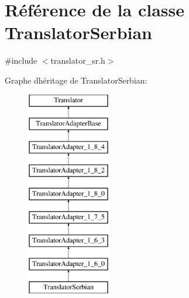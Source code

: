 \hypertarget{class_translator_serbian}{}\section{Référence de la classe Translator\+Serbian}
\label{class_translator_serbian}


{\ttfamily \#include $<$translator\+\_\+sr.\+h$>$}

Graphe d\textquotesingle{}héritage de Translator\+Serbian\+:\begin{figure}[H]
\begin{center}
\leavevmode
\includegraphics[height=9.000000cm]{class_translator_serbian}
\end{center}
\end{figure}
